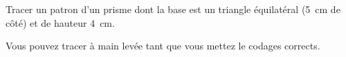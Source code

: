 
\begin{exercice}\label{exo2smath-0319}

    Tracer un patron d'un prisme dont la base est un triangle équilatéral (\SI{5}{\centi\meter} de côté) et de hauteur \SI{4}{\centi\meter}.

    Vous pouvez tracer à main levée tant que vous mettez le codages corrects.

\end{exercice}
